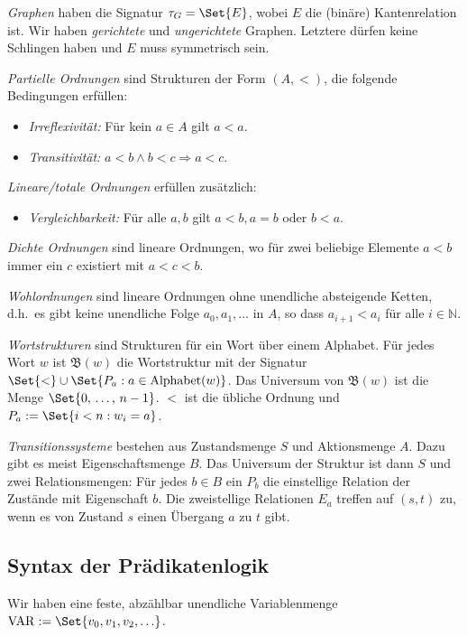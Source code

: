 \documentclass{panikzettel}
\newcommand{\VAR}{\mathrm{VAR}}
\begin{document}
\emph{Graphen} haben die Signatur $\tau_G = \Set{E}$, wobei $E$ die (binäre) Kantenrelation ist. Wir haben \emph{gerichtete} und \emph{ungerichtete} Graphen. Letztere dürfen keine Schlingen haben und $E$ muss symmetrisch sein.

\emph{Partielle Ordnungen} sind Strukturen der Form $(A,<)$, die folgende Bedingungen erfüllen:
\begin{itemize}
  \item \emph{Irreflexivität:} Für kein $a \in A$ gilt $a < a$.
  \item \emph{Transitivität:} $a < b \land b < c \Rightarrow a < c$.
\end{itemize}

\emph{Lineare/totale Ordnungen} erfüllen zusätzlich:
\begin{itemize}
  \item \emph{Vergleichbarkeit:} Für alle $a,b$ gilt $a < b, a = b$ oder $b < a$.
\end{itemize}

\emph{Dichte Ordnungen} sind lineare Ordnungen, wo für zwei beliebige Elemente $a < b$ immer ein $c$ existiert mit $a < c < b$.

\emph{Wohlordnungen} sind lineare Ordnungen ohne unendliche absteigende Ketten, d.h.\ es gibt keine unendliche Folge $a_0, a_1, \ldots$ in $A$, so dass $a_{i+1} < a_i$ für alle $i \in \mathbb{N}$.

\emph{Wortstrukturen} sind Strukturen für ein Wort über einem Alphabet. Für jedes Wort $w$ ist $\mathfrak{B}(w)$ die Wortstruktur mit der Signatur $\Set{<} \cup \Set{P_a : a \in \mathrm{Alphabet}(w)}$. Das Universum von $\mathfrak{B}(w)$ ist die Menge $\Set{0,\, \ldots,\, n-1}$. $<$ ist die übliche Ordnung und $P_a := \Set{i < n : w_i = a}$.

\emph{Transitionssysteme} bestehen aus Zustandsmenge $S$ und Aktionsmenge $A$. Dazu gibt es meist Eigenschaftsmenge $B$. Das Universum der Struktur ist dann $S$ und zwei Relationsmengen: Für jedes $b \in B$ ein $P_b$ die einstellige Relation der Zustände mit Eigenschaft $b$. Die zweistellige Relationen $E_a$ treffen auf $(s,t)$ zu, wenn es von Zustand $s$ einen Übergang $a$ zu $t$ gibt.

\subsection{Syntax der Prädikatenlogik}

Wir haben eine feste, abzählbar unendliche Variablenmenge $\VAR := \Set{v_0, v_1, v_2, \ldots}$.
\end{document}
